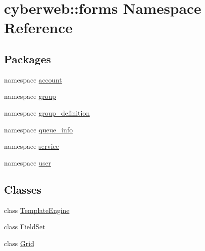 \hypertarget{namespacecyberweb_1_1forms}{\section{cyberweb\-:\-:forms \-Namespace \-Reference}
\label{namespacecyberweb_1_1forms}
}
\subsection*{\-Packages}
\begin{DoxyCompactItemize}
\item 
namespace \hyperlink{namespacecyberweb_1_1forms_1_1account}{account}
\item 
namespace \hyperlink{namespacecyberweb_1_1forms_1_1group}{group}
\item 
namespace \hyperlink{namespacecyberweb_1_1forms_1_1group__definition}{group\-\_\-definition}
\item 
namespace \hyperlink{namespacecyberweb_1_1forms_1_1queue__info}{queue\-\_\-info}
\item 
namespace \hyperlink{namespacecyberweb_1_1forms_1_1service}{service}
\item 
namespace \hyperlink{namespacecyberweb_1_1forms_1_1user}{user}
\end{DoxyCompactItemize}
\subsection*{\-Classes}
\begin{DoxyCompactItemize}
\item 
class \hyperlink{classcyberweb_1_1forms_1_1_template_engine}{\-Template\-Engine}
\item 
class \hyperlink{classcyberweb_1_1forms_1_1_field_set}{\-Field\-Set}
\item 
class \hyperlink{classcyberweb_1_1forms_1_1_grid}{\-Grid}
\end{DoxyCompactItemize}
